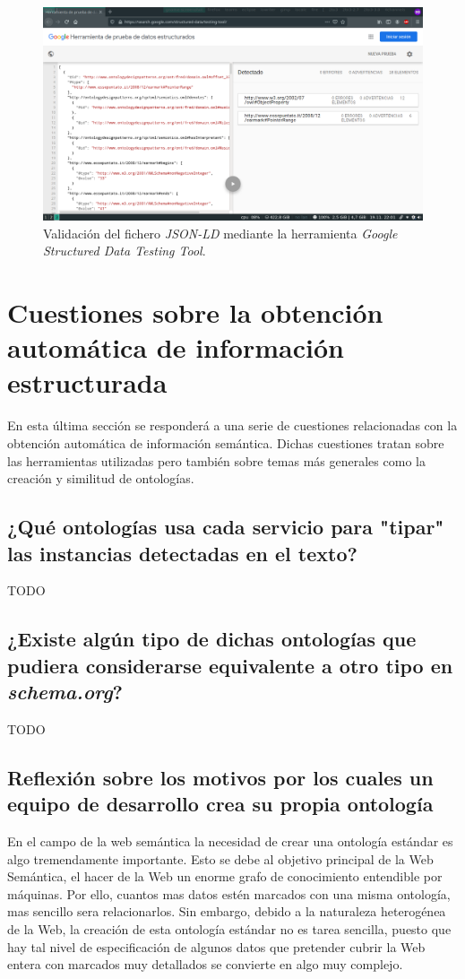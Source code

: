 \documentclass[11pt]{article}
\begin{document}
\begin{figure}[h]
\caption{Validación del fichero \textit{JSON-LD} mediante la herramienta \textit{Google Structured Data Testing Tool}.}
\centering
\includegraphics[width=\textwidth]{fred_3}
\end{figure}
\section{Cuestiones sobre la obtención automática de información estructurada}
En esta última sección se responderá a una serie de cuestiones relacionadas con la obtención automática de información semántica. Dichas cuestiones tratan sobre las herramientas utilizadas pero también sobre temas más generales como la creación y similitud de ontologías.

\subsection{¿Qué ontologías usa cada servicio para "tipar" las instancias detectadas en el texto?}
TODO

\subsection{¿Existe algún tipo de dichas ontologías que pudiera considerarse equivalente a otro tipo en \textit{schema.org}?}
TODO

\subsection{Reflexión sobre los motivos por los cuales un equipo de desarrollo crea su propia ontología}
En el campo de la web semántica la necesidad de crear una ontología estándar es algo tremendamente importante. Esto se debe al objetivo principal de la Web Semántica, el hacer de la Web un enorme grafo de conocimiento entendible por máquinas. Por ello, cuantos mas datos estén marcados con una misma ontología, mas sencillo sera relacionarlos. Sin embargo, debido a la naturaleza heterogénea de la Web, la creación de esta ontología estándar no es tarea sencilla, puesto que hay tal nivel de especificación de algunos datos que pretender cubrir la Web entera con marcados muy detallados se convierte en algo muy complejo.
\end{document}
